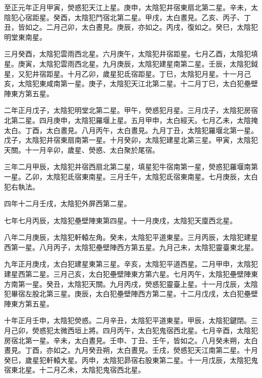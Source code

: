 \begin{pinyinscope}
 至正元年正月甲寅，熒惑犯天江上星。庚申，太陰犯井宿東扇北第二星。辛未，太陰犯心宿距星。癸酉，太陰犯鬥宿北第二星。甲戌，太白晝見。乙亥、丙子、丁丑，皆如之。二月己卯，太白晝見。庚辰，亦如之。丙戌，復如之。癸巳，太陰犯明堂東南星。



 三月癸酉，太陰犯雲雨西北星。六月庚午，太陰犯井宿距星。七月乙酉，太陰犯填星。庚寅，太陰犯雲雨西北星。九月庚辰，太陰犯建星南第二星。壬辰，太陰犯鉞星，又犯井宿距星。十月乙卯，歲星犯氐宿距星。丁巳，太陰犯月星。十一月己亥，太陰犯東咸南第一星。庚子，太陰犯天江北第二星。十二月丁巳，太白犯壘壁陣東方第五星。



 二年正月戊子，太陰犯明堂北第二星。甲午，熒惑犯月星。三月戊子，太陰犯房宿北第二星。四月庚申，太陰犯羅堰上星。五月甲申，太白經天。七月乙未，太陰掩太白。丁酉，太白晝見。八月丙午，太白晝見。九月丁丑，太陰犯羅堰北第一星。戊子，太陰犯井宿東扇南第一星。十月癸卯，太陰犯建星北第三星。甲寅，太陰犯天關。十一月辛卯，歲星、熒惑、太白聚於尾宿。



 三年二月甲辰，太陰犯井宿西扇北第二星，填星犯牛宿南第一星，熒惑犯羅堰南第一星。乙卯，太陰犯氐宿東南星。三月壬午，太陰犯氐宿東南星。七月庚辰，太白犯右執法。



 四年十二月壬戌，太陰犯外屏西第二星。



 七年七月丙辰，太陰犯壘壁陣東第四星。十一月庚戌，太陰犯天廩西北星。



 八年二月庚辰，太陰犯軒轅左角。癸未，太陰犯平道東星。三月丙辰，太陰犯建星西第一星。八月丙子，太陰犯壘壁陣西方第五星。九月己未，太陰犯靈臺東北星。



 九年正月庚戌，太白犯建星東第三星。辛亥，太陰犯平道西星。二月甲申，太陰犯建星西第二星。三月己亥，太白犯壘壁陣東方第六星。七月丙午，太陰犯壘壁陣東方南第一星。癸丑，太陰犯天關。九月丙戌，熒惑犯靈臺上星。十一月戊辰，太陰犯畢宿左股北第三星。庚辰，太白犯壘壁陣西方第二星。十二月戊戌，太白犯壘壁陣東方第五星。



 十年正月壬申，太陰犯熒惑。二月辛丑，太陰犯平道東星。甲辰，太陰犯鍵閉。三月己卯，熒惑犯太微西垣上將。四月丙午，太白犯鬼宿西北星。七月辛酉，太陰犯房宿北第一星。辛未，太白晝見。壬申、丁丑、壬午，皆如之。八月癸未朔，太白晝見。丁酉，亦如之。九月癸丑朔，太白晝見。壬戌，熒惑犯天江南第二星。十月癸巳，歲星犯軒轅大星。丙申，太陰犯昴宿右股東第二星。十一月戊辰，太陰犯鬼宿東北星。十二月乙未，太陰犯鬼宿西北星。




\end{pinyinscope}
